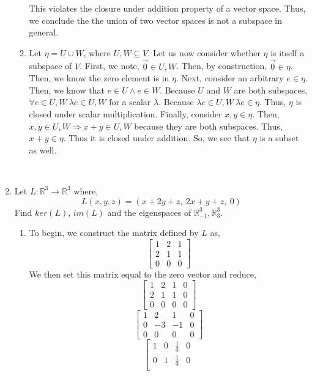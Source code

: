 \documentclass[letterpaper,10pt]{article}
\newcommand{\R}{\mathbb{R}}
\begin{document}
\begin{enumerate}
\begin{enumerate}
\begin{center}
{}
\end{center}
This violates the closure under addition property of a vector space. Thus, we conclude the the union of two vector spaces is not a subspace in general.
\item Let $\eta=U\cup W$, where $U,W\subseteq V$. Let us now consider whether $\eta$ is itself a subspace of $V$. First, we note, $\vec{0}\in U,W$. Then, by construction, $\vec{0}\in\eta$. Then, we know the zero element is in $\eta$. Next, consider an arbitrary $e\in \eta$. Then, we know that $e\in U \wedge e\in W$. Because $U$ and $W$ are both subspaces, $\forall e \in U,W\ \lambda e\in U,W$ for a scalar $\lambda$. Because $\lambda e\in U,W\ \lambda e \in \eta$. Thus, $\eta$ is closed under scalar multiplication. Finally, consider $x,y\in \eta$. Then, $x,y\in U,W\Rightarrow x+y\in U,W$ because they are both subspaces. Thus, $x+y\in \eta$. Thus it is closed under addition. So, we see that $\eta$ is a subset as well.
\end{enumerate}\
\item Let $L:\R^3\to \R^3$ where,
\[L(x,y,z)=(x+2y+z,\ 2x+y+z,\ 0)\]
Find $ker(L)$, $im(L)$ and the eigenspaces of $\R^3_{-1},\R^3_3$.
\begin{enumerate}
\item To begin, we construct the matrix defined by $L$ as,
\[\begin{bmatrix}
1 & 2 & 1 \\
2 & 1 & 1 \\
0 & 0 & 0
\end{bmatrix} \]
We then set this matrix equal to the zero vector and reduce,
\[\left[ \begin{array}{ccc|c}
1 & 2 & 1 & 0\\
2 & 1 & 1 & 0\\
0 & 0 & 0 & 0
\end{array}\right] \]
\[\left[ \begin{array}{ccc|c}
1 & 2 & 1 & 0\\
0 & -3 & -1 & 0\\
0 & 0 & 0 & 0
\end{array}\right]\]
\[\left[ \begin{array}{ccc|c}
1 & 0 & \frac{1}{3} & 0\\
0 & 1 & \frac{1}{3} & 0\\

\end{array}\]
\end{enumerate}
\end{enumerate}
\end{document}
